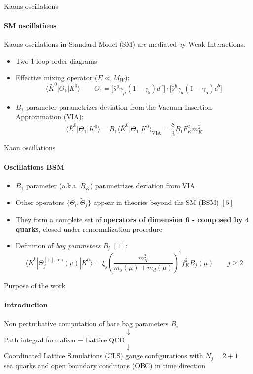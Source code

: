 \documentclass{beamer}
\newcommand{\la}{\langle}
\newcommand{\ra}{\rangle}
\begin{document}
\begin{frame}{Kaons oscillations}
      \framesubtitle{SM oscillations}
      Kaons oscillations in Standard Model (SM) are mediated by Weak Interactions.
      \begin{itemize}
            \item Two 1-loop order diagrams
            \item Effective mixing operator ($E \ll M_W$):
            \begin{equation*}
                  \la \bar K^0 | \Theta_1 | K^0 \ra \qquad \Theta_1 = \Big[ \bar s^a \gamma_\mu (1-\gamma_5) d^a \Big] \cdot \Big[ \bar s^b \gamma_\mu (1-\gamma_5) d^b \Big]
            \end{equation*}
            \item $B_1$ parameter parametrizes deviation from the Vacuum Insertion Approximation (VIA):
            \begin{equation*}
                  \la \bar K^0 | \Theta_1 | K^0 \ra = B_1 \la \bar K^0 | \Theta_1 | K^0 \ra_\text{VIA} = \frac{8}{3} B_1 F_K^2 m_K^2
            \end{equation*}
      \end{itemize}
\end{frame}

\begin{frame}[fragile]{Kaon oscillations}
      \framesubtitle{Oscillations BSM}
      \begin{itemize}
            \item $B_1$ parameter (a.k.a. $B_K$) parametrizes deviation from VIA
            \item Other operators $\{\Theta_i,\tilde\Theta_j\}$ appear in theories beyond the SM (BSM) $[5]$
            \item They form a complete set of {\bf operators of dimension 6 - composed by 4 quarks}, closed under renormalization procedure
            \item Definition of \emph{bag parameters} $B_j$ $[1]$:
            \begin{equation*}
                  \la \bar K^0 | \Theta_j^{[+],\text{ren}} (\mu) | K^0 \ra = \xi_j \left(\frac{m_K^2}{m_s(\mu)+m_d(\mu)}\right)^2 f_K^2 B_j(\mu) \qquad j \ge 2
            \end{equation*}
      \end{itemize}
\end{frame}

\begin{frame}{Purpose of the work}
      \framesubtitle{Introduction}
      \centering
      Non perturbative computation of bare bag parameters $B_i$
      $$\downarrow$$
      Path integral formalism $-$ Lattice QCD
      $$\downarrow$$
      Coordinated Lattice Simulations (CLS) gauge configurations with $N_f = 2+1 $\\ sea quarks and open boundary conditions (OBC) in time direction
\end{frame}
\end{document}
